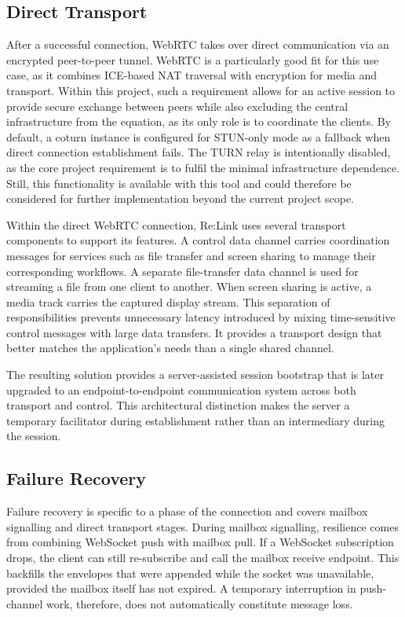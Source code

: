 \documentclass[12pt,a4paper,oneside]{report}
\begin{document}
\subsection{Direct Transport}
\label{sec:direct-transport}

After a successful connection, WebRTC takes over direct communication via an encrypted peer-to-peer tunnel. WebRTC is a particularly good fit for this use case, as it combines ICE-based NAT traversal with encryption for media and transport. Within this project, such a requirement allows for an active session to provide secure exchange between peers while also excluding the central infrastructure from the equation, as its only role is to coordinate the clients. By default, a coturn instance is configured for STUN-only mode as a fallback when direct connection establishment fails. The TURN relay is intentionally disabled, as the core project requirement is to fulfil the minimal infrastructure dependence. Still, this functionality is available with this tool and could therefore be considered for further implementation beyond the current project scope.

Within the direct WebRTC connection, Re:Link uses several transport components to support its features. A control data channel carries coordination messages for services such as file transfer and screen sharing to manage their corresponding workflows. A separate file-transfer data channel is used for streaming a file from one client to another. When screen sharing is active, a media track carries the captured display stream. This separation of responsibilities prevents unnecessary latency introduced by mixing time-sensitive control messages with large data transfers. It provides a transport design that better matches the application's needs than a single shared channel.

The resulting solution provides a server-assisted session bootstrap that is later upgraded to an endpoint-to-endpoint communication system across both transport and control. This architectural distinction makes the server a temporary facilitator during establishment rather than an intermediary during the session.


\subsection{Failure Recovery}
\label{sec:failure-recovery}

Failure recovery is specific to a phase of the connection and covers mailbox signalling and direct transport stages. During mailbox signalling, resilience comes from combining WebSocket push with mailbox pull. If a WebSocket subscription drops, the client can still re-subscribe and call the mailbox receive endpoint. This backfills the envelopes that were appended while the socket was unavailable, provided the mailbox itself has not expired. A temporary interruption in push-channel work, therefore, does not automatically constitute message loss.
\end{document}
